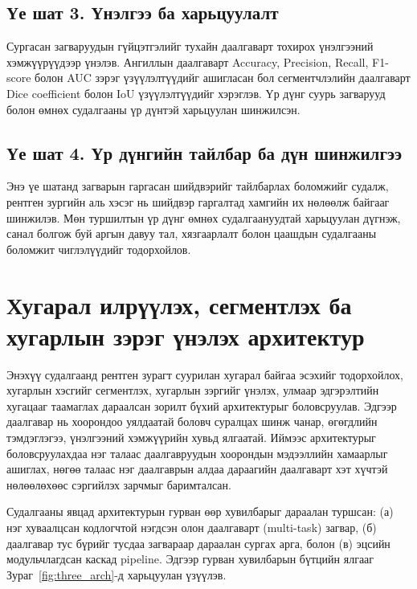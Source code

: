 \subsection*{Үе шат 3. Үнэлгээ ба харьцуулалт}

Сургасан загваруудын гүйцэтгэлийг тухайн даалгаварт тохирох үнэлгээний хэмжүүрүүдээр үнэлэв. Ангиллын даалгаварт Accuracy, Precision, Recall, F1-score болон AUC зэрэг үзүүлэлтүүдийг ашигласан бол сегментчлэлийн даалгаварт Dice coefficient болон IoU үзүүлэлтүүдийг хэрэглэв. Үр дүнг суурь загварууд болон өмнөх судалгааны үр дүнтэй харьцуулан шинжилсэн.

\subsection*{Үе шат 4. Үр дүнгийн тайлбар ба дүн шинжилгээ}

Энэ үе шатанд загварын гаргасан шийдвэрийг тайлбарлах боломжийг судалж, рентген зургийн аль хэсэг нь шийдвэр гаргалтад хамгийн их нөлөөлж байгааг шинжилэв. Мөн туршилтын үр дүнг өмнөх судалгаануудтай харьцуулан дүгнэж, санал болгож буй аргын давуу тал, хязгаарлалт болон цаашдын судалгааны боломжит чиглэлүүдийг тодорхойлов.


\section{Хугарал илрүүлэх, сегментлэх ба хугарлын зэрэг үнэлэх архитектур}
\label{sec:arch_v1}

Энэхүү судалгаанд рентген зурагт суурилан хугарал байгаа эсэхийг тодорхойлох, хугарлын хэсгийг сегментлэх, хугарлын зэргийг үнэлэх, улмаар эдгэрэлтийн хугацааг таамаглах дараалсан зорилт бүхий архитектурыг боловсруулав. Эдгээр даалгавар нь хоорондоо уялдаатай боловч суралцах шинж чанар, өгөгдлийн тэмдэглэгээ, үнэлгээний хэмжүүрийн хувьд ялгаатай. Иймээс архитектурыг боловсруулахдаа нэг талаас даалгавруудын хоорондын мэдээллийн хамаарлыг ашиглах, нөгөө талаас нэг даалгаврын алдаа дараагийн даалгаварт хэт хүчтэй нөлөөлөхөөс сэргийлэх зарчмыг баримталсан.

Судалгааны явцад архитектурын гурван өөр хувилбарыг дараалан туршсан: (а) нэг хуваалцсан кодлогчтой нэгдсэн олон даалгаварт (multi-task) загвар, (б) даалгавар тус бүрийг тусдаа загвараар дараалан сургах арга, болон (в) эцсийн модульчлагдсан каскад pipeline. Эдгээр гурван хувилбарын бүтцийн ялгааг Зураг~\ref{fig:three_arch}-д харьцуулан үзүүлэв.

